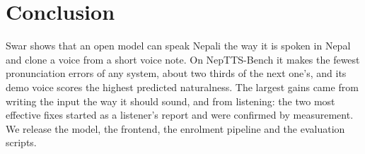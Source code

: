 \section{Conclusion}
Swar shows that an open model can speak Nepali the way it is spoken in Nepal and clone a voice from a short voice note. On NepTTS-Bench it makes the fewest pronunciation errors of any system, about two thirds of the next one's, and its demo voice scores the highest predicted naturalness. The largest gains came from writing the input the way it should sound, and from listening: the two most effective fixes started as a listener's report and were confirmed by measurement. We release the model, the frontend, the enrolment pipeline and the evaluation scripts.
